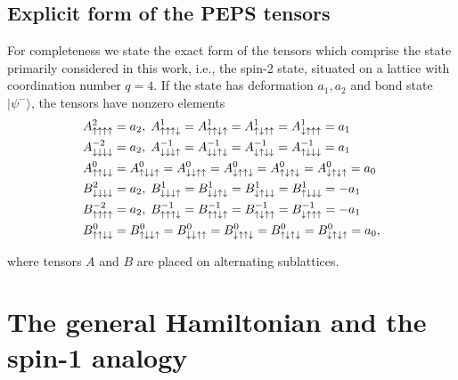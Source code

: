 \documentclass[aps,prb,letterpaper,superscriptaddress,twocolumn,showpacs,floatfix,10pt]{revtex4-1}
\begin{document}
\subsection{Explicit form of the PEPS tensors} 
%
For completeness we state the exact form of the tensors which comprise the
state primarily considered in this work, i.e., the spin-2 state, situated on
a lattice with coordination number $q=4$.
If the state has deformation $a_1,a_2$ and bond state $|\psi^-\rangle$,
the tensors have nonzero elements
\begin{align}
\label{square_tps}
&A^{2  }_{\uparrow\uparrow\uparrow\uparrow} = a_{2},  \;   A^{1 }_{\uparrow\uparrow\uparrow\downarrow}= A^{1  }_{\uparrow\uparrow\downarrow\uparrow} =A^{1  }_{\uparrow\downarrow\uparrow\uparrow} =A^{1  }_{\downarrow\uparrow\uparrow\uparrow} =a_{1} \notag \\
&  A^{-2}_{\downarrow\downarrow\downarrow\downarrow} = a_{2},  \;   A^{-1}_{\downarrow\downarrow\downarrow\uparrow}= A^{-1}_{\downarrow\downarrow\uparrow\downarrow} =A^{-1}_{\downarrow\uparrow\downarrow\downarrow} =A^{-1}_{\uparrow\downarrow\downarrow\downarrow} =a_{1}  \notag \\
&A^{0  }_{\uparrow\uparrow\downarrow\downarrow} =A^{0}_{\uparrow\downarrow\downarrow\uparrow}= A^{0 }_{\downarrow\downarrow\uparrow\uparrow} =A^{0}_{\downarrow\uparrow\uparrow\downarrow}=A^{0 }_{\uparrow\downarrow\uparrow\downarrow}=A^{0 }_{\downarrow\uparrow\downarrow\uparrow} =a_{0} \\
&  B^{2}_{\downarrow\downarrow\downarrow\downarrow} = a_{2},  \;   B^{1}_{\downarrow\downarrow\downarrow\uparrow}= B^{1}_{\downarrow\downarrow\uparrow\downarrow} =B^{1}_{\downarrow\uparrow\downarrow\downarrow} =B^{1}_{\uparrow\downarrow\downarrow\downarrow} =-a_{1}  \notag \\
&B^{-2  }_{\uparrow\uparrow\uparrow\uparrow} = a_{2},  \;   B^{-1 }_{\uparrow\uparrow\uparrow\downarrow}= B^{-1  }_{\uparrow\uparrow\downarrow\uparrow} =B^{-1  }_{\uparrow\downarrow\uparrow\uparrow} =B^{-1  }_{\downarrow\uparrow\uparrow\uparrow} =-a_{1} \notag \\
&B^{0 }_{\uparrow\uparrow\downarrow\downarrow} =B^{0}_{\uparrow\downarrow\downarrow\uparrow}= B^{0 }_{\downarrow\downarrow\uparrow\uparrow} =B^{0}_{\downarrow\uparrow\uparrow\downarrow}=B^{0 }_{\uparrow\downarrow\uparrow\downarrow}=B^{0 }_{\downarrow\uparrow\downarrow\uparrow} = a_{0} ,
\end{align} 

where tensors $A$ and $B$ are placed on alternating sublattices.


\section{The general Hamiltonian and the spin-1 analogy}
\label{app:ham}
\end{document}
